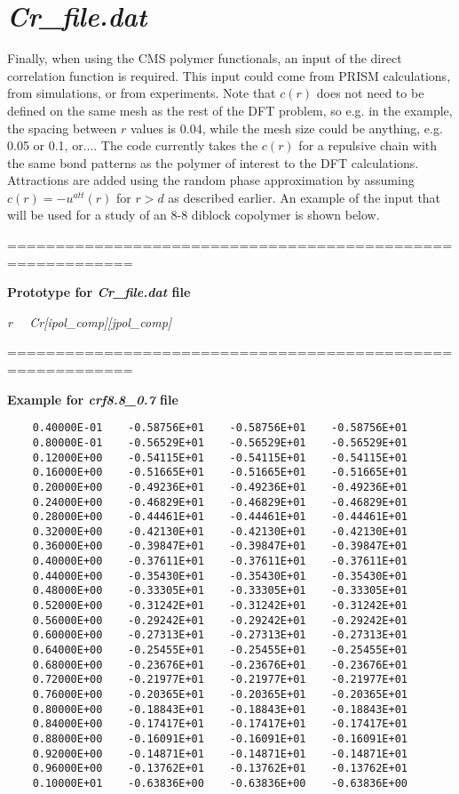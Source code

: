 \documentclass[10pt,onecolumn]{article}
\begin{document}
\section{{\it Cr\_file.dat}}
\label{sec:crfile}
Finally, when using the CMS polymer functionals, an input of the
direct correlation function is required.  This input could come from  
PRISM calculations, from simulations, or from experiments.  Note that $c(r)$ does not need to be defined on the same mesh as the rest of the DFT problem, so e.g. in the example, the spacing between $r$ values is 0.04, while the mesh size could be anything, e.g. 0.05 or 0.1, or....
The code currently
takes the $c(r)$ for a repulsive chain with the same bond patterns
as the polymer of interest to the DFT calculations.  Attractions
are added using the random phase approximation by assuming $c(r)=-u^{att}(r)$ for $r>d$
as described earlier. An example of the input that will be used
for a study of an 8-8 diblock copolymer is shown below.  

\vspace{0.1in}
\noindent===========================================================

{\bf Prototype for {\it Cr\_file.dat} file}

{\it r \ \ Cr[ipol\_comp][jpol\_comp] }

\noindent===========================================================

{\bf Example for {\it crf8.8\_0.7} file}

\begin{verbatim}
    0.40000E-01    -0.58756E+01    -0.58756E+01    -0.58756E+01
    0.80000E-01    -0.56529E+01    -0.56529E+01    -0.56529E+01
    0.12000E+00    -0.54115E+01    -0.54115E+01    -0.54115E+01
    0.16000E+00    -0.51665E+01    -0.51665E+01    -0.51665E+01
    0.20000E+00    -0.49236E+01    -0.49236E+01    -0.49236E+01
    0.24000E+00    -0.46829E+01    -0.46829E+01    -0.46829E+01
    0.28000E+00    -0.44461E+01    -0.44461E+01    -0.44461E+01
    0.32000E+00    -0.42130E+01    -0.42130E+01    -0.42130E+01
    0.36000E+00    -0.39847E+01    -0.39847E+01    -0.39847E+01
    0.40000E+00    -0.37611E+01    -0.37611E+01    -0.37611E+01
    0.44000E+00    -0.35430E+01    -0.35430E+01    -0.35430E+01
    0.48000E+00    -0.33305E+01    -0.33305E+01    -0.33305E+01
    0.52000E+00    -0.31242E+01    -0.31242E+01    -0.31242E+01
    0.56000E+00    -0.29242E+01    -0.29242E+01    -0.29242E+01
    0.60000E+00    -0.27313E+01    -0.27313E+01    -0.27313E+01
    0.64000E+00    -0.25455E+01    -0.25455E+01    -0.25455E+01
    0.68000E+00    -0.23676E+01    -0.23676E+01    -0.23676E+01
    0.72000E+00    -0.21977E+01    -0.21977E+01    -0.21977E+01
    0.76000E+00    -0.20365E+01    -0.20365E+01    -0.20365E+01
    0.80000E+00    -0.18843E+01    -0.18843E+01    -0.18843E+01
    0.84000E+00    -0.17417E+01    -0.17417E+01    -0.17417E+01
    0.88000E+00    -0.16091E+01    -0.16091E+01    -0.16091E+01
    0.92000E+00    -0.14871E+01    -0.14871E+01    -0.14871E+01
    0.96000E+00    -0.13762E+01    -0.13762E+01    -0.13762E+01
    0.10000E+01    -0.63836E+00    -0.63836E+00    -0.63836E+00
\end{verbatim}
\end{document}
